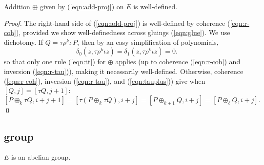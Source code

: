 \documentclass{llncs}
\begin{document}
\begin{lemma} Addition $\oplus$ given by
  (\ref{eqn:add-proj}) on $E$ is well-defined.
\end{lemma}

\begin{proof}
  The right-hand side of (\ref{eqn:add-proj}) is well-defined by
  coherence (\ref{eqn:r-coh}), provided we show well-definedness
  across gluings (\ref{eqn:glue}).  We use dichotomy.  If $Q=\tau
  \rho^k \iota\,P$, then by an easy simplification of polynomials,
\[
\delta_0(z,\tau\rho^k\iota z)=\delta_1(z,\tau\rho^k\iota z)=0.
\]
so that only one rule (\ref{eqn:tt}) for $\oplus$ applies (up to
coherence (\ref{eqn:r-coh}) and inversion (\ref{eqn:r-tau})), making
it necessarily well-defined.  Otherwise, coherence (\ref{eqn:r-coh}),
inversion (\ref{eqn:r-tau}), and (\ref{eqn:tauplus})) give when
$[Q,j]=[\tau Q,j+1]$:
 \[ 
[P\oplus_k \tau Q,i+j+1]=[\tau(P\oplus_k \tau Q),i+j] =
 [P\oplus_{k+1} Q,i+j] = [P\oplus_\ell Q,i+j].
\]
\qed\end{proof}

\subsection{group}

\begin{theorem}  $E$ is an abelian group.
\end{theorem}
\end{document}
